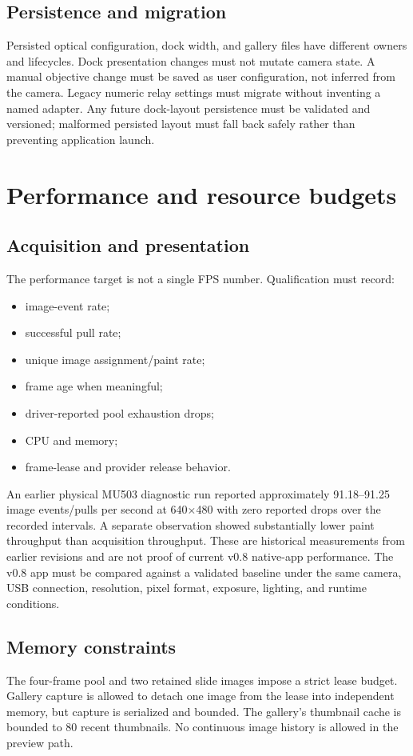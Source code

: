 \documentclass[11pt,a4paper,oneside]{article}
\begin{document}
\subsection{Persistence and migration}
Persisted optical configuration, dock width, and gallery files have different owners and lifecycles. Dock presentation changes must not mutate camera state. A manual objective change must be saved as user configuration, not inferred from the camera. Legacy numeric relay settings must migrate without inventing a named adapter. Any future dock-layout persistence must be validated and versioned; malformed persisted layout must fall back safely rather than preventing application launch.

\section{Performance and resource budgets}

\subsection{Acquisition and presentation}
The performance target is not a single FPS number. Qualification must record:
\begin{itemize}
  \item image-event rate;
  \item successful pull rate;
  \item unique image assignment/paint rate;
  \item frame age when meaningful;
  \item driver-reported pool exhaustion drops;
  \item CPU and memory;
  \item frame-lease and provider release behavior.
\end{itemize}

An earlier physical MU503 diagnostic run reported approximately 91.18--91.25 image events/pulls per second at 640$\times$480 with zero reported drops over the recorded intervals. A separate observation showed substantially lower paint throughput than acquisition throughput. These are historical measurements from earlier revisions and are not proof of current v0.8 native-app performance. The v0.8 app must be compared against a validated baseline under the same camera, USB connection, resolution, pixel format, exposure, lighting, and runtime conditions.

\subsection{Memory constraints}
The four-frame pool and two retained slide images impose a strict lease budget. Gallery capture is allowed to detach one image from the lease into independent memory, but capture is serialized and bounded. The gallery's thumbnail cache is bounded to 80 recent thumbnails. No continuous image history is allowed in the preview path.
\end{document}
